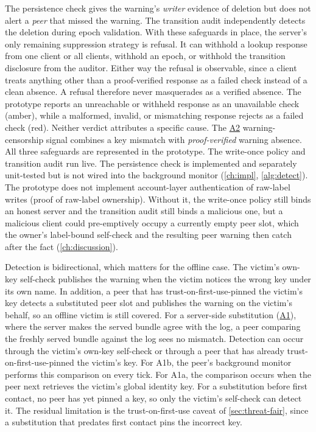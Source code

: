 The persistence check gives the warning's \emph{writer} evidence of deletion but does not alert a
\emph{peer} that missed the warning. The transition audit independently detects the deletion during
epoch validation. With these safeguards in place, the server's only remaining suppression strategy is
refusal. It can withhold a lookup response from one client or all clients, withhold an epoch, or
withhold the transition disclosure from the auditor. Either way the refusal is observable, since a
client treats anything other than a proof-verified response as a failed check instead of a clean
absence. A refusal therefore never masquerades as a verified absence. The prototype reports an
unreachable or withheld response as an unavailable check (amber), while a malformed, invalid, or
mismatching response rejects as a failed check (red). Neither verdict attributes a specific cause. The \hyperref[sc:threat-a2]{A2}
warning-censorship signal combines a key
mismatch with \emph{proof-verified} warning absence. All three safeguards are
represented in the prototype. The write-once policy and transition audit run live. The persistence
check is implemented and separately unit-tested but is not wired into the background
monitor (\cref{ch:impl}, \cref{alg:detect}).
The prototype does not implement account-layer authentication of raw-label writes (proof of raw-label
ownership). Without it, the write-once policy still binds an honest server and the transition audit
still binds a malicious one, but a malicious client could pre-emptively occupy a currently empty peer
slot, which the owner's label-bound self-check and the resulting peer warning then catch after the
fact (\cref{ch:discussion}).

Detection is bidirectional, which matters for the offline case. The victim's own-key self-check
publishes the warning when the victim notices the wrong key under its own name. In addition, a peer
that has trust-on-first-use-pinned the victim's key detects a substituted peer slot and publishes the
warning on the victim's behalf, so an offline victim is still covered. For a server-side substitution
(\hyperref[sc:threat-a1]{A1}), where the server makes the served bundle agree with the log, a peer comparing the freshly
served bundle against the log sees no mismatch. Detection can occur through the victim's own-key
self-check or through a peer that has already trust-on-first-use-pinned the victim's key. For A1b,
the peer's background monitor performs this comparison on every tick. For A1a, the comparison occurs
when the peer next retrieves the victim's global identity key. For a substitution before first
contact, no peer has yet pinned a key, so only the victim's self-check can detect it. The residual limitation is the
trust-on-first-use caveat of \cref{sec:threat-fair}, since a substitution that predates first contact
pins the incorrect key.

